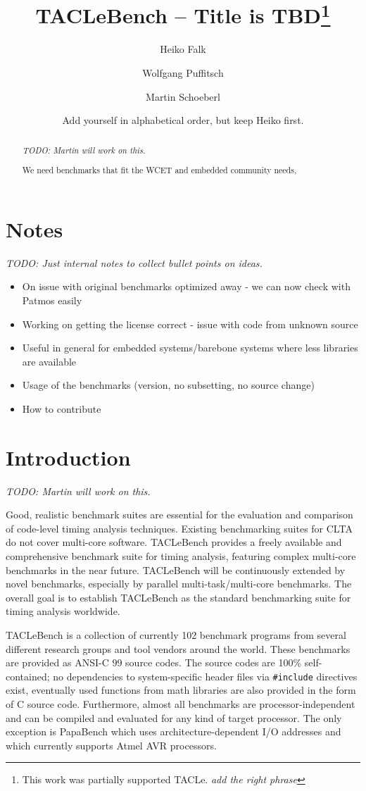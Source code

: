 \documentclass[a4paper,UKenglish]{oasics}
\title{TACLeBench -- Title is TBD\footnote{This work was partially supported TACLe. \emph{add the right phrase}}}
\author[1]{Heiko Falk}
\author[2]{Wolfgang Puffitsch}
\author[2]{Martin Schoeberl}
\author[2]{Add yourself in alphabetical order, but keep Heiko first.}
\affil[1]{Dummy University Computing Laboratory\\
  Address, Country\\
  \texttt{open@dummyuni.org}}
\affil[2]{Technical University of Denmark, Department of Applied Mathematics and Computer Science, Denmark\\
  \texttt{\{wopu, masca\}@dtu.dk}}
\newcommand{\todo}[1]{{\emph{TODO: #1}}}
\newcommand{\code}[1]{{\small{\texttt{#1}}}}
\begin{document}
\maketitle

\begin{abstract}
\todo{Martin will work on this.}

We need benchmarks that fit the WCET and embedded community needs,


 \end{abstract}

\section{Notes}

\todo{Just internal notes to collect bullet points on ideas.}

\begin{itemize}
\item On issue with original benchmarks optimized away - we can now check with Patmos easily
\item Working on getting the license correct - issue with code from unknown source
\item Useful in general for embedded systems/barebone systems where less libraries are available
\item Usage of the benchmarks (version, no subsetting, no source change)
\item How to contribute
\end{itemize}

\section{Introduction}
\label{sec:intro}

\todo{Martin will work on this.}

     Good, realistic benchmark suites are essential for the evaluation and comparison of code-level timing analysis techniques. Existing benchmarking suites for CLTA do not cover multi-core software. TACLeBench provides a freely available and comprehensive benchmark suite for timing analysis, featuring complex multi-core benchmarks in the near future. TACLeBench will be continuously extended by novel benchmarks, especially by parallel multi-task/multi-core benchmarks. The overall goal is to establish TACLeBench as the standard benchmarking suite for timing analysis worldwide.

    TACLeBench is a collection of currently 102 benchmark programs from several different research groups and tool vendors around the world. These benchmarks are provided as ANSI-C 99 source codes. The source codes are 100\% self-contained; no dependencies to system-specific header files via \code{\#include} directives exist, eventually used functions from math libraries are also provided in the form of C source code. Furthermore, almost all benchmarks are processor-independent and can be compiled and evaluated for any kind of target processor. The only exception is PapaBench which uses architecture-dependent I/O addresses and which currently supports Atmel AVR processors.
\end{document}
